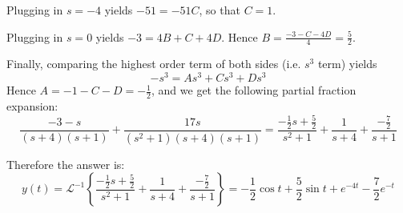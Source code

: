 \documentclass[12pt]{report}
\begin{document}
Plugging in $s=-4$ yields $-51 = -51C$, so that $C=1$. 

Plugging in $s=0$ yields $-3= 4B+C+4D$. Hence $B=\frac{-3-C-4D}{4} = \frac{5}{2}$. 

Finally, comparing the highest order term of both sides (i.e. $s^3$ term) yields
$$-s^3 = As^3 + Cs^3 + Ds^3 $$
Hence $A=-1-C-D= -\frac{1}{2}$, and we get the following partial fraction expansion:
$$ \frac{-3-s}{(s+4)(s+1)} +\frac{17s}{(s^2 +1)(s+4)(s+1)}= \frac{-\frac{1}{2}s+\frac{5}{2}}{s^2 +1} + \frac{1}{s+4} + \frac{-\frac{7}{2}}{s+1} $$


Therefore the answer is:
$$y(t) = \mathcal{L}^{-1} \left\{\frac{-\frac{1}{2}s+\frac{5}{2}}{s^2 +1} + \frac{1}{s+4} + \frac{-\frac{7}{2}}{s+1} \right\} =  -\frac{1}{2} \cos{t} + \frac{5}{2}\sin{t}  + e^{-4t} - \frac{7}{2} e^{-t} $$
\end{document}
